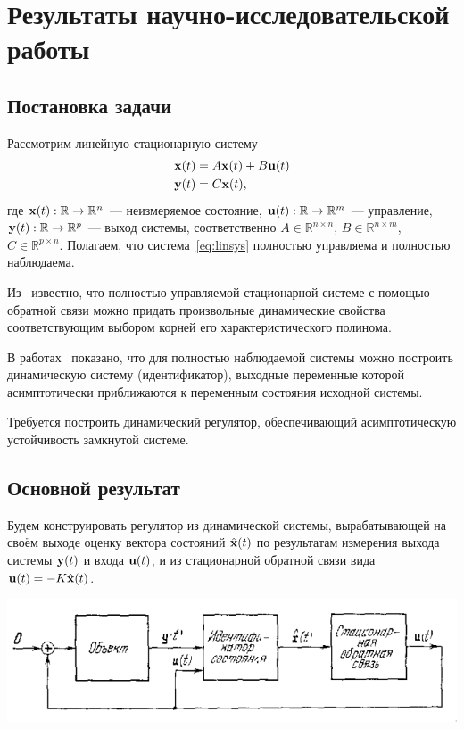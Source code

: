 \documentclass[a4paper,14pt]{article}
\theoremstyle{definition}
\begin{document}
\section{Результаты научно-исследовательской работы}

\subsection{Постановка задачи}

Рассмотрим линейную стационарную систему
\begin{equation}\label{eq:linsys}
  \begin{aligned}
    \dot{\vb{x}}(t) &= A \vb{x}(t) + B \vb{u}(t) \\
    \vb{y}(t) &= C \vb{x}(t),
  \end{aligned}
\end{equation}
где $\vb{x}(t): \mathbb{R} \to \mathbb{R}^n$ --- неизмеряемое состояние, $\vb{u}(t): \mathbb{R} \to \mathbb{R}^m$ --- управление,
$\vb{y}(t): \mathbb{R} \to \mathbb{R}^p$ --- выход системы, соответственно
$A \in \mathbb{R}^{n \times n}$, $B \in \mathbb{R}^{n \times m}$, $C \in \mathbb{R}^{p \times n}$.
Полагаем, что система~\eqref{eq:linsys} полностью управляема и полностью наблюдаема.

Из~\cite{Andreev1976} известно, что полностью управляемой стационарной системе с помощью обратной связи
можно придать произвольные динамические свойства соответствующим выбором
корней его характеристического полинома.

В работах~\cite{Andreev1976,Smirnov2022} показано, что для полностью наблюдаемой системы можно
построить динамическую систему (идентификатор), выходные переменные которой
асимптотически приближаются к переменным состояния исходной системы.

Требуется построить динамический регулятор, обеспечивающий асимптотическую устойчивость замкнутой системе.

\subsection{Основной результат}

Будем конструировать регулятор из динамической системы, вырабатывающей на своём выходе
оценку вектора состояний $\hat{\vb{x}}(t)$ по результатам измерения выхода системы $\vb{y}(t)$
и входа $\vb{u}(t)$, и из стационарной обратной связи вида $\vb{u}(t) = -K\hat{\vb{x}}(t)$.

\begin{center}
  \includegraphics[width=16cm]{Regulator}
\end{center}
\end{document}
